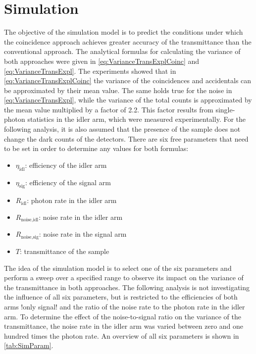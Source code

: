 \section{Simulation}
The objective of the simulation model is to predict the conditions under which the coincidence approach achieves greater accuracy of the transmittance than the conventional approach. The analytical formulas for calculating the variance of both approaches were given in \autoref{eq:VarianceTransExplCoinc} and \ref{eq:VarianceTransExpl}. The experiments showed that in \autoref{eq:VarianceTransExplCoinc} the variance of the coincidences and accidentals can be approximated by their mean value. The same holds true for the noise in \autoref{eq:VarianceTransExpl}, while the variance of the total counts is approximated by the mean value multiplied by a factor of 2.2. This factor results from single-photon statistics in the idler arm, which were measured experimentally. For the following analysis, it is also assumed that the presence of the sample does not change the dark counts of the detectors. \newline
There are six free parameters that need to be set in order to determine any values for both formulas:
\begin{itemize}[topsep=0pt, partopsep=0pt, itemsep=1.5pt, parsep=0pt, leftmargin=3em]
	\item $\eta_{\text{idl}}$: efficiency of the idler arm
	\item $\eta_{\text{sig}}$: efficiency of the signal arm
	\item $R_{\text{idl}}$: photon rate in the idler arm
	\item $R_{\text{noise,idl}}$: noise rate in the idler arm
	\item $R_{\text{noise,sig}}$: noise rate in the signal arm
	\item $T$: transmittance of the sample 
\end{itemize}
The idea of the simulation model is to select one of the six parameters and perform a sweep over a specified range to observe its impact on the variance of the transmittance in both approaches. The following analysis is not investigating the influence of all six parameters, but is restricted to the efficiencies of both arms !only signal! and the ratio of the noise rate to the photon rate in the idler arm. \newline
To determine the effect of the noise-to-signal ratio on the variance of the transmittance, the noise rate in the idler arm was varied between zero and one hundred times the photon rate. An overview of all six parameters is shown in \autoref{tab:SimParam}.

